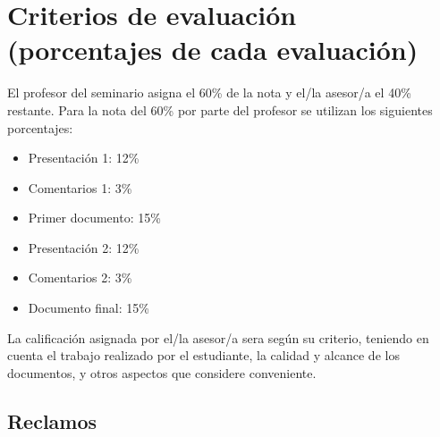 \documentclass[12pt]{article}
\begin{document}


\section{Criterios de evaluación (porcentajes de cada evaluación)}

El profesor del seminario asigna el 60\% de la nota y el/la asesor/a el 40\% restante. Para la nota del 60\% por parte del profesor se utilizan los siguientes porcentajes:

\begin{itemize}
    \item Presentación 1:  \hspace{1.9cm}		12\% \vspace{-0.4em}	
    \item Comentarios 1:   \hspace{2.0cm}		3\%	\vspace{-0.4em}
    \item Primer documento: \hspace{1.3cm}		15\% \vspace{-0.4em}
    \item Presentación 2:  \hspace{2.0cm}		12\% \vspace{-0.4em}	 
    \item Comentarios 2:   \hspace{2.1cm}		3\%	\vspace{-0.4em}
    \item Documento final: \hspace{1.7cm}		15\% \vspace{-0.4em}
\end{itemize}    

La calificación asignada por el/la asesor/a sera según su criterio, teniendo en cuenta el trabajo realizado por el estudiante, la calidad y alcance de los documentos, y otros aspectos que considere conveniente.    

\subsection*{Reclamos} 
\end{document}
